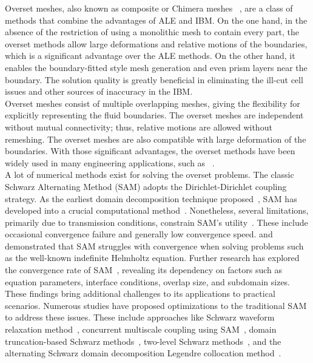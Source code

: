\documentclass[preprint,12pt,sort&compress]{elsarticle}
\theoremstyle{definition}%
\begin{document}
Overset meshes, also known as composite or Chimera meshes
~\cite{volkov1968method, henshaw1994fourth, henshaw2009composite,appelo2012numerical,koblitz2017direct,meng2020fourth}, are a class of methods that combine the advantages of ALE and IBM. 
On the one hand, in the absence of the restriction of using a monolithic mesh to contain every part, the overset methods allow large deformations and relative motions of the boundaries, which is a significant advantage over the ALE methods.
On the other hand, it enables the boundary-fitted style mesh generation and even prism layers near the boundary. The solution quality is greatly beneficial in eliminating the ill-cut cell issues and other sources of inaccuracy in the IBM.\\
Overset meshes consist of multiple overlapping meshes, giving the flexibility for explicitly representing the fluid boundaries.
The overset meshes are independent without mutual connectivity; thus, relative motions are allowed without remeshing.
The overset meshes are also compatible with large deformation of the boundaries.
With those significant advantages, the overset methods have been widely used in many engineering applications, such as ~\cite{overset1,overset2,overset3,overset4,zhao2023computational}.\\
A lot of numerical methods exist for solving the overset problems.
The classic Schwarz Alternating Method (SAM) adopts the Dirichlet-Dirichlet coupling strategy. As the earliest domain decomposition technique proposed~\cite{Schwarz1869}, SAM has developed 
into a crucial computational method~\cite{tang2021review,dolean2015introduction}.
Nonetheless, several limitations, primarily due to transmission conditions, constrain SAM's utility~\cite{gander2008schwarz}.
These include occasional convergence failure and generally low convergence speed.
\cite{gander2008schwarz} and~\cite{dolean2015introduction} demonstrated that SAM struggles with convergence when solving problems such as the well-known indefinite Helmholtz equation.
Further research has explored the convergence rate of SAM~\cite{tang2021review, oliger1986convergence, nataf1994optimal,gander2022schwarz}, revealing its dependency on factors such as equation parameters, interface conditions, overlap size, and subdomain sizes. These findings bring additional challenges to its applications to practical scenarios. 
Numerous studies have proposed optimizations to the traditional SAM to address these issues.
These include approaches like Schwarz waveform relaxation method~\cite{martin2005optimized}, concurrent multiscale coupling using SAM~\cite{mota2017schwarz}, domain truncation-based Schwarz methods~\cite{gander2022schwarz}, two-level Schwarz methods~\cite{alcin2013efficiency}, and the alternating Schwarz domain decomposition Legendre collocation method~\cite{martinez2023schwarz}. 
\end{document}
